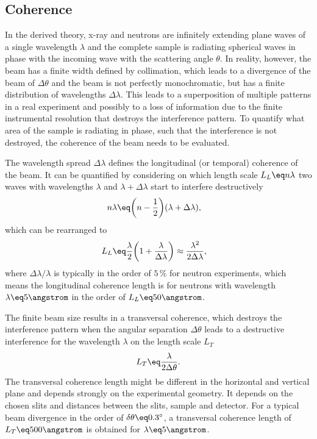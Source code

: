 \documentclass[\main/dresen_thesis.tex]{subfiles}
\begin{document}
  \subsection{Coherence}\label{sec:theoreticalBackground:scattering:CoherenceInstrumentalResolution}

    In the derived theory, x-ray and neutrons are infinitely extending plane waves of a single wavelength $\lambda$ and the complete sample is radiating spherical waves in phase with the incoming wave with the scattering angle $\theta$.
    In reality, however, the beam has a finite width defined by collimation, which leads to a divergence of the beam of $\Delta \theta$ and the beam is not perfectly monochromatic, but has a finite distribution of wavelengths $\Delta \lambda$.
    This leads to a superposition of multiple patterns in a real experiment and possibly to a loss of information due to the finite instrumental resolution that destroys the interference pattern.
    To quantify what area of the sample is radiating in phase, such that the interference is not destroyed, the coherence of the beam needs to be evaluated.

    The wavelength spread $\Delta \lambda$ defines the longitudinal (or temporal) coherence of the beam. It can be quantified by considering on which length scale $L_L \eq n \lambda$ two waves with wavelengths $\lambda$ and $\lambda + \Delta \lambda$ start to interfere destructively
    \begin{align}
      n\lambda \eq& \biggl(n - \frac{1}{2} \biggr)(\lambda + \Delta \lambda),
    \end{align}
    which can be rearranged to
    \begin{align}
      L_L \eq& \frac{\lambda}{2} \biggl(1 + \frac{\lambda}{\Delta \lambda} \biggr) \approx \frac{\lambda^2}{2 \Delta \lambda},
    \end{align}
    where $\Delta \lambda / \lambda$ is typically in the order of $5\, \%$ for neutron experiments, which means the longitudinal coherence length is for neutrons with wavelength $\lambda \eq 5 \angstrom$ in the order of $L_L \eq 50 \angstrom$.

    The finite beam size results in a transversal coherence, which destroys the interference pattern when the angular separation $\Delta \theta$ leads to a destructive interference for the wavelength $\lambda$ on the length scale $L_T$
    \begin{align}
      L_T \eq \frac{\lambda}{2 \Delta\theta}.
    \end{align}
    The transversal coherence length might be different in the horizontal and vertical plane and depends strongly on the experimental geometry.
    It depends on the chosen slits and distances between the slits, sample and detector.
    For a typical beam divergence in the order of $\delta \theta \eq 0.3^\circ$, a transversal coherence length of $L_T \eq 500 \angstrom$ is obtained for $\lambda \eq 5 \angstrom$.
\end{document}
